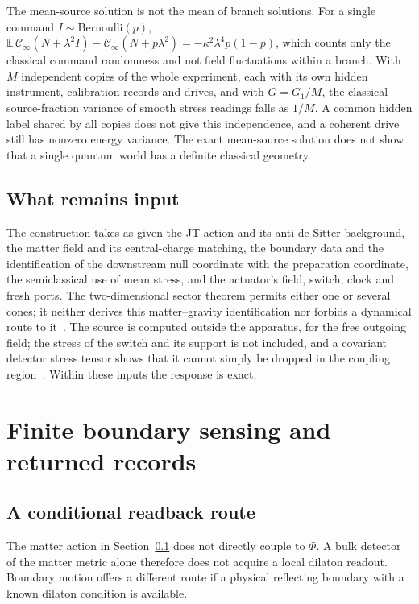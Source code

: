 The mean-source solution is not the mean of branch solutions. For a single command $I\sim\mathrm{Bernoulli}(p)$, $\mathbb E\,\mathcal C_\infty(N+\lambda^2I)-\mathcal C_\infty(N+p\lambda^2)=-\kappa^2\lambda^4p(1-p)$, which counts only the classical command randomness and not field fluctuations within a branch. With $M$ independent copies of the whole experiment, each with its own hidden instrument, calibration records and drives, and with $G=G_1/M$, the classical source-fraction variance of smooth stress readings falls as $1/M$. A common hidden label shared by all copies does not give this independence, and a coherent drive still has nonzero energy variance. The exact mean-source solution does not show that a single quantum world has a definite classical geometry.

\subsection{What remains input}
\label{sec:inputs}

The construction takes as given the JT action and its anti-de Sitter background, the
matter field and its central-charge matching, the boundary data and the identification
of the downstream null coordinate with the preparation coordinate, the semiclassical
use of mean stress, and the actuator's field, switch, clock and fresh ports. The
two-dimensional sector theorem permits either one or several cones; it neither
derives this matter--gravity identification nor forbids a dynamical route to it~\cite{Liu2026QRAIF_A}.
The source is computed outside the apparatus, for the free outgoing field; the stress
of the switch and its support is not included, and a covariant detector stress tensor
shows that it cannot simply be dropped in the coupling region~\cite{Perche2025}.
Within these inputs the response is exact.


\section{Finite boundary sensing and returned records}
\label{app:boundary-return}

\subsection{A conditional readback route}
\label{sec:echo}

The matter action in Section~\ref{sec:inputs} does not directly couple to
$\Phi$. A bulk detector of the matter metric alone therefore does not acquire a
local dilaton readout. Boundary motion offers a different route if a physical
reflecting boundary with a known dilaton condition is available.

